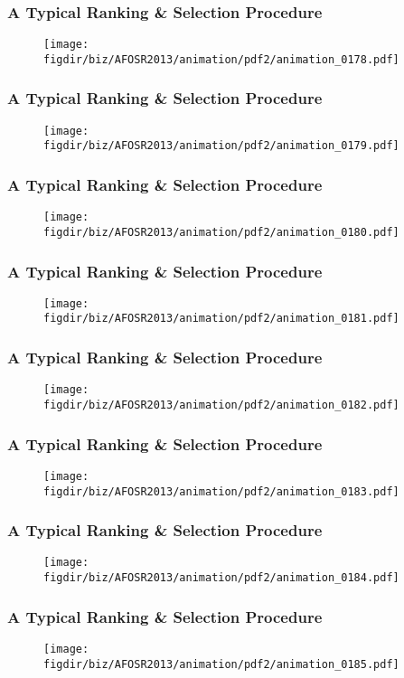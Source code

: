 \documentclass[13pt]{beamer}
\newcommand{\figdir}{../../fig}
\begin{document}
\begin{frame}\frametitle{A Typical Ranking \& Selection Procedure}\begin{figure}\texttt{[image: \\figdir/biz/AFOSR2013/animation/pdf2/animation\_0178.pdf]}\end{figure}\end{frame}
\begin{frame}\frametitle{A Typical Ranking \& Selection Procedure}\begin{figure}\texttt{[image: \\figdir/biz/AFOSR2013/animation/pdf2/animation\_0179.pdf]}\end{figure}\end{frame}
\begin{frame}\frametitle{A Typical Ranking \& Selection Procedure}\begin{figure}\texttt{[image: \\figdir/biz/AFOSR2013/animation/pdf2/animation\_0180.pdf]}\end{figure}\end{frame}
\begin{frame}\frametitle{A Typical Ranking \& Selection Procedure}\begin{figure}\texttt{[image: \\figdir/biz/AFOSR2013/animation/pdf2/animation\_0181.pdf]}\end{figure}\end{frame}
\begin{frame}\frametitle{A Typical Ranking \& Selection Procedure}\begin{figure}\texttt{[image: \\figdir/biz/AFOSR2013/animation/pdf2/animation\_0182.pdf]}\end{figure}\end{frame}
\begin{frame}\frametitle{A Typical Ranking \& Selection Procedure}\begin{figure}\texttt{[image: \\figdir/biz/AFOSR2013/animation/pdf2/animation\_0183.pdf]}\end{figure}\end{frame}
\begin{frame}\frametitle{A Typical Ranking \& Selection Procedure}\begin{figure}\texttt{[image: \\figdir/biz/AFOSR2013/animation/pdf2/animation\_0184.pdf]}\end{figure}\end{frame}
\begin{frame}\frametitle{A Typical Ranking \& Selection Procedure}\begin{figure}\texttt{[image: \\figdir/biz/AFOSR2013/animation/pdf2/animation\_0185.pdf]}\end{figure}\end{frame}
\end{document}
